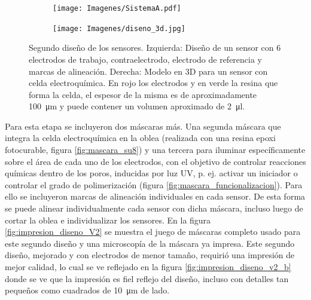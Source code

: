 		    	    \begin{figure}[b!]
			 	    \begin{subfigure}[t]{0.395\textwidth}
			       	\texttt{[image: Imagenes/SistemaA.pdf]}
			    	\end{subfigure}
					\begin{subfigure}[t]{0.595\textwidth}
			        \texttt{[image: Imagenes/diseno\_3d.jpg]}
			        \end{subfigure}
			     	\caption[Segundo diseño y máscara de los sensores]{Segundo diseño de los sensores. Izquierda: Diseño de un sensor con 6 electrodos de trabajo, contraelectrodo, electrodo de referencia y marcas de alineación. Derecha: Modelo en 3D para un sensor con celda electroquímica. En rojo los electrodos y en verde la resina que forma la celda, el espesor de la misma es de aproximadamente \SI{100}{\um} y puede contener un volumen aproximado de \SI{2}{\ul}.}
			     	\label{fig:mascara_diseno_v2}
			     	\end{figure}
			 
				 Para esta etapa se incluyeron dos máscaras más. Una segunda máscara que integra la celda electroquímica en la oblea (realizada con una resina epoxi fotocurable, figura \ref{fig:mascara_su8}) y una tercera para iluminar específicamente sobre el área de cada uno de los electrodos, con el objetivo de controlar reacciones químicas dentro de los poros, inducidas por luz UV, p. ej. activar un iniciador o controlar el grado de polimerización  (figura \ref{fig:mascara_funcionalizacion}).\cite{Andrieu-Brunsen2015,Herzog2015,Silies2015} Para ello se incluyeron marcas de alineación individuales en cada sensor. De esta forma se puede alinear individualmente cada sensor con dicha máscara, incluso luego de cortar la oblea e individualizar los sensores. En la figura \ref{fig:impresion_diseno_V2} se muestra el juego de máscaras completo usado para este segundo diseño y una microscopía de la máscara ya impresa. Este segundo diseño, mejorado y con electrodos de menor tamaño, requirió una impresión de mejor calidad, lo cual se ve reflejado en la figura \ref{fig:impresion_diseno_v2_b} donde se ve que la impresión es fiel reflejo del diseño, incluso con detalles tan pequeños como cuadrados de \SI{10}{\um} de lado. 

